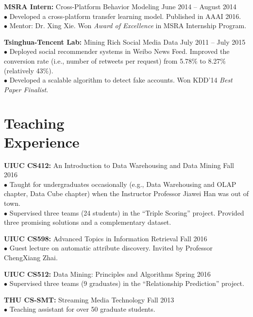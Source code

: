 \documentclass[margin, 10pt]{res}
\begin{document}
\begin{resume}
{\textbf{MSRA Intern:} Cross-Platform Behavior Modeling} \hfill{June 2014 -- August 2014} \\
$\bullet$ Developed a cross-platform transfer learning model. Published in AAAI 2016. \\
$\bullet$ Mentor: Dr. Xing Xie. Won \textit{Award of Excellence} in MSRA Internship Program.

{\textbf{Tsinghua-Tencent Lab:} Mining Rich Social Media Data} \hfill{July 2011 -- July 2015} \\
$\bullet$ Deployed social recommender systems in Weibo News Feed. Improved the conversion rate (i.e., number of retweets per request) from 5.78\% to 8.27\% (relatively 43\%). \\
$\bullet$ Developed a scalable algorithm to detect fake accounts. Won KDD'14 \textit{Best Paper Finalist}.


\section{Teaching \\ Experience}

{\textbf{UIUC CS412:} An Introduction to Data Warehousing and Data Mining} \hfill{Fall 2016} \\
$\bullet$ Taught for undergraduates occasionally (e.g., Data Warehousing and OLAP chapter, Data Cube chapter) when the Instructor Professor Jiawei Han was out of town. \\
$\bullet$ Supervised three teams (24 students) in the ``Triple Scoring'' project. Provided three promising solutions and a complementary dataset.

{\textbf{UIUC CS598:} Advanced Topics in Information Retrieval} \hfill{Fall 2016} \\
$\bullet$ Guest lecture on automatic attribute discovery. Invited by Professor ChengXiang Zhai.

{\textbf{UIUC CS512:} Data Mining: Principles and Algorithms} \hfill{Spring 2016} \\
$\bullet$ Supervised three teams (9 graduates) in the ``Relationship Prediction'' project.

{\textbf{THU CS-SMT:} Streaming Media Technology} \hfill{Fall 2013} \\
$\bullet$ Teaching assistant for over 50 {graduate} students.


\end{resume}
\end{document}
